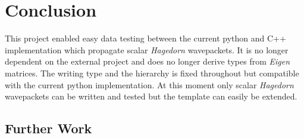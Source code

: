 \chapter{Conclusion}
This project enabled easy data testing between the current python and C++ implementation which propagate scalar \textit{Hagedorn} wavepackets. It is no longer dependent on the external project \cite{eigen3-hdf5} and does no longer derive types from \textit{Eigen} matrices. The writing type and the hierarchy is fixed throughout but compatible with the current python implementation. At this moment only scalar \textit{Hagedorn} wavepackets can be written and tested but the template can easily be extended.

\section{Further Work}
